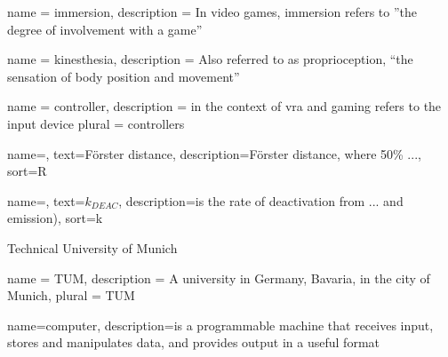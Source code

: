 





{
    name = immersion,
    description = {In video games, immersion refers to ''the degree of involvement with a game'' \autocite{gameImmersion}}
}

{
    name = kinesthesia,
    description = {Also referred to as proprioception, \enquote{the sensation of body position and movement}\autocite{proprioception}}
}

{
    name = controller,
    description = {in the context of \gls{vra} and gaming refers to the input device}
    plural = controllers
}



{
  name=,
  text=F\"{o}rster distance,
  description={F\"{o}rster distance, where 50\% ...}, 
  sort=R
}

{
  name=,
  text=$k_{DEAC}$, 
  description={is the rate of deactivation from ... and emission)}, 
  sort=k
}

{Technical University of Munich}

{
  name = TUM,
  description = {A university in Germany, Bavaria, in the city of Munich},
  plural = TUM
}

{
  name=computer,
  description={is a programmable machine that receives input,
               stores and manipulates data, and provides
               output in a useful format}
}